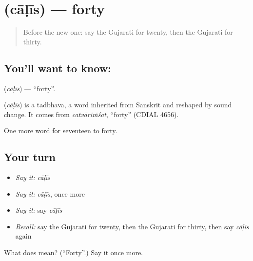 \section[\texorpdfstring{\gu{ચાળીસ} (cāḷīs)}{ચાળીસ (cāḷīs)}]{ (cāḷīs) — forty}

\label{lesson:GU-C82-forty}



\begin{quote}
Before the new one: say the Gujarati for twenty, then the Gujarati for thirty.
\end{quote}

\subsection*{You'll want to know: }
\textbf{} (\emph{cāḷīs}) — \textquotedblleft{}forty\textquotedblright{}.

\begin{cousinweb}
\textbf{} (\emph{cāḷīs}) is a tadbhava, a word inherited from Sanskrit and reshaped by sound change. It comes from \emph{catvāriṁśat}, \textquotedblleft{}forty\textquotedblright{} (CDIAL 4656).
\end{cousinweb}

\begin{grammarlens}[title={What you've built}]
One more word for seventeen to forty.
\end{grammarlens}

\subsection*{Your turn}
\begin{itemize}
\raggedright
  \item \emph{Say it:} \emph{cāḷīs}
  \item \emph{Say it:} \emph{cāḷīs}, once more
  \item \emph{Say it:} say \emph{cāḷīs}
  \item \emph{Recall:} say the Gujarati for twenty, then the Gujarati for thirty, then say \emph{cāḷīs} again
\end{itemize}

\begin{tcolorbox}[breakable,colback=teal!4,colframe=teal!35!black,title={Before you move on}]
What does  mean? (\textquotedblleft{}Forty\textquotedblright{}.) Say it once more.
\end{tcolorbox}
